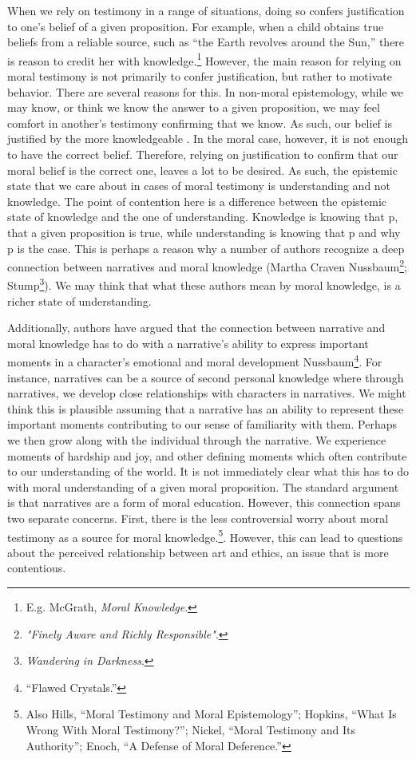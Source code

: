 \documentclass[phdthesis,12pt,final]{wuthesis}
\theoremstyle{definition}
\theoremstyle{definition}
\theoremstyle{definition}
\theoremstyle{definition}
\theoremstyle{remark}
\begin{document}
When we rely on testimony in a range of situations, doing so confers justification to one's belief of a given proposition. For example, when a child obtains true beliefs from a reliable source, such as ``the Earth revolves around the Sun,'' there is reason to credit her with knowledge.\footnote{E.g. McGrath, \emph{Moral {Knowledge}}.} However, the main reason for relying on moral testimony is not primarily to confer justification, but rather to motivate behavior. There are several reasons for this. In non-moral epistemology, while we may know, or think we know the answer to a given proposition, we may feel comfort in another's testimony confirming that we know. As such, our belief is justified by the more knowledgeable . In the moral case, however, it is not enough to have the correct belief. Therefore, relying on justification to confirm that our moral belief is the correct one, leaves a lot to be desired. As such, the epistemic state that we care about in cases of moral testimony is understanding and not knowledge. The point of contention here is a difference between the epistemic state of knowledge and the one of understanding. Knowledge is knowing that p, that a given proposition is true, while understanding is knowing that p and why p is the case. This is perhaps a reason why a number of authors recognize a deep connection between narratives and moral knowledge (Martha Craven Nussbaum\footnote{\emph{"{Finely Aware} and {Richly Responsible}"}.}; Stump\footnote{\emph{Wandering in {Darkness}}.}). We may think that what these authors mean by moral knowledge, is a richer state of understanding.

Additionally, authors have argued that the connection between narrative and moral knowledge has to do with a narrative's ability to express important moments in a character's emotional and moral development Nussbaum\footnote{{``Flawed {Crystals}.''}}. For instance, narratives can be a source of second personal knowledge where through narratives, we develop close relationships with characters in narratives. We might think this is plausible assuming that a narrative has an ability to represent these important moments contributing to our sense of familiarity with them. Perhaps we then grow along with the individual through the narrative. We experience moments of hardship and joy, and other defining moments which often contribute to our understanding of the world. It is not immediately clear what this has to do with moral understanding of a given moral proposition. The standard argument is that narratives are a form of moral education. However, this connection spans two separate concerns. First, there is the less controversial worry about moral testimony as a source for moral knowledge.\footnote{Also Hills, {``Moral Testimony and Moral Epistemology''}; Hopkins, {``What {Is Wrong With Moral Testimony}?''}; Nickel, {``Moral {Testimony} and Its {Authority}''}; Enoch, {``A {Defense} of {Moral Deference}.''}}. However, this can lead to questions about the perceived relationship between art and ethics, an issue that is more contentious.
\end{document}
